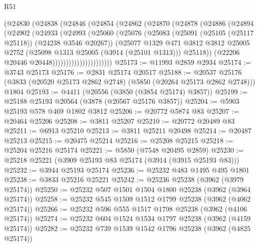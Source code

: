 \begin{lexlean}{R51}
\begin{coremodule}
                  (@24830
                    (@24838
                      (@24846
                        (@24854
                          (@24862
                            (@24870
                              (@24878
                                (@24886
                                  (@24894
                                    (@24902
                                      (@24933
                                        (@24993
                                          (@25060
                                            (@25076
                                              (@25083
                                                (@25091
                                                  (@25105 (@25117 @25118))
                                                  (@24238 @3546 @20267))
                                                (@25077
                                                  @1329
                                                  @471
                                                  @3812
                                                  @3812
                                                  @25005
                                                  @2752
                                                  (@25098 @1313 @25005 (@3914 (@25101 @1313)))
                                                  @25118))
                                              (@22206 @20446 @20448))))))))))))))))))))))
@25173 := @11993 @2859 @2934
@25174 := @3743 @25173
@25176 := @2831 @25174 @20517
@25188 := @20537
    @25176
    (@3833 (@20520 @25173 @2862 @2748) (@5850 (@20264 @25173 @2862 @2748)))
    @1804
@25193 := @4411 (@20556 (@3850 (@3854 @25174) @3857))
@25199 := @25188 @25193 @20564 (@3878 (@20567 @25176 @3857))
@25204 := @5903 @25193 @578 @469 @1802 @3812
@25206 := @20772 @5874 @83
@25207 := @20464 @25206
@25208 := @3811 @25207
@25210 := @20772 @20489 @83
@25211 := @6913 @25210
@25213 := @3811 @25211 @20498
@25214 := @20487 @25213
@25215 := @20475 @25214
@25216 := @25208 @25215
@25218 := @25204 @25216 @25174
@25221 := @5850 (@7548 @20495 @2859)
@25230 := @25218 @25221 (@3909 @25193 @83 @25174 (@3914 (@3915 @25193 @83)))
@25232 := @3944 @25193 @25174
@25236 := @25232 @483 @1495 @495 @1801
@25238 := @3833 @25216 @25221
@25242 := @25236 @25238 (@3962 (@3979 @25174))
@25250 := @25232 @507 @1501 @1504 @1800 @25238 (@3962 (@3964 @25174))
@25258 := @25232 @545 @1509 @1512 @1799 @25238 (@3962 (@4062 @25174))
@25266 := @25232 @596 @555 @1517 @1798 @25238 (@3962 (@4106 @25174))
@25274 := @25232 @604 @1524 @1534 @1797 @25238 (@3962 (@4159 @25174))
@25282 := @25232 @739 @1539 @1542 @1796 @25238 (@3962 (@4825 @25174))

\end{coremodule}
\end{lexlean}
